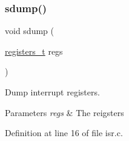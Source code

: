 \subsubsection{\texorpdfstring{sdump()}{sdump()}}
{\footnotesize\ttfamily void sdump (\begin{DoxyParamCaption}\item[{\hyperlink{a00140_adf58dbaf6139b4957c348711f2026957_adf58dbaf6139b4957c348711f2026957}{registers\+\_\+t}}]{regs }\end{DoxyParamCaption})}



Dump interrupt registers. 


\begin{DoxyParams}{Parameters}
{\em regs} & The reigsters \\
\hline
\end{DoxyParams}


Definition at line 16 of file isr.\+c.



